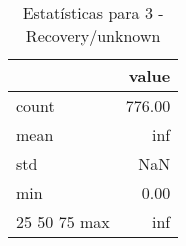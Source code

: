 \begin{table}[htbp]
\caption{Estatísticas para 3 - Recovery/unknown}
\label{tab:3_-_recovery_unknown_summary}
\begin{tabular}{lr}
\toprule
 & value \\
\midrule
count & 776.00 \\
mean & inf \\
std & NaN \\
min & 0.00 \\
25%
50%
75%
max & inf \\
\bottomrule
\end{tabular}
\end{table}
